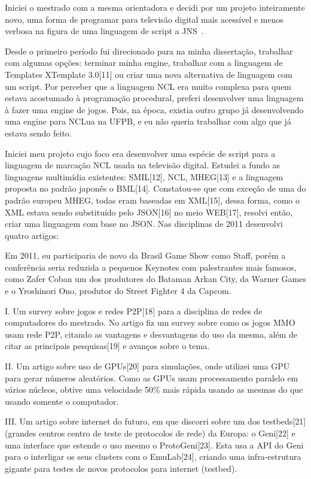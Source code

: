 \documentclass[10pt,a4paper,oneside]{book}
\begin{document}
Iniciei o mestrado com a mesma orientadora e decidi por um projeto inteiramente novo, uma forma 
de programar para televisão digital mais acessível e menos verbosa na figura de uma linguagem de 
script a JNS~\cite{silva2013jns}.

 Desde o primeiro período fui direcionado para na minha dissertação, trabalhar com algumas opções: 
 terminar minha engine, trabalhar com a linguagem de Templates XTemplate 3.0[11] ou criar uma nova 
 alternativa de linguagem com um script. Por perceber que a linguagem NCL era muito complexa para 
 quem estava acostumado à programação procedural, preferi desenvolver uma linguagem à fazer uma 
 engine de jogos. Pois, na época, existia outro grupo já desenvolvendo uma engine para NCLua na 
 UFPB, e eu não queria trabalhar com algo que já estava sendo feito.

Iniciei meu projeto cujo foco era desenvolver uma espécie de script para a linguagem de marcação 
NCL usada na televisão digital. Estudei a fundo as linguagens multimídia existentes: SMIL[12], NCL, 
MHEG[13] e a linguagem proposta no padrão japonês o BML[14]. Constatou-se que com exceção de uma do 
padrão europeu MHEG, todas eram baseadas em XML[15], dessa forma, como o XML estava sendo substituído 
pelo JSON[16] no meio WEB[17], resolvi então, criar uma linguagem com base no JSON.  
Nas disciplinas de 2011 desenvolvi quatro artigos:

Em 2011, eu participaria de novo da Brasil Game Show como Staff, porém a conferência seria reduzida 
a pequenos Keynotes com palestrantes mais famosos, como  Zafer Coban um dos produtores do Bataman 
Arkan City, da Warner Games e o Yroshinori Ono, produtor do Street Fighter 4 da Capcom.

I.  Um survey sobre jogos e redes P2P[18] para a disciplina de redes de computadores do mestrado. 
No artigo fiz um survey sobre como os jogos MMO usam rede P2P, citando as vantagens e desvantagens 
do uso da mesma, além de citar as principais pesquisas[19] e avanços sobre o tema.

II. Um artigo sobre uso de GPUs[20] para simulações, onde utilizei uma GPU para gerar números 
aleatórios. Como as GPUs usam processamento paralelo em vários núcleos, obtive uma velocidade 
50\% mais rápida usando as mesmas do que usando somente o computador.

III. Um artigo sobre internet do futuro, em que discorri sobre um dos testbeds[21] 
(grandes centros centro de teste de protocolos de rede) da Europa: o Geni[22] e uma 
interface que estende o uso mesmo o ProtoGeni[23]. Esta usa a API do Geni para o interligar os 
seus clusters com o EmuLab[24],  criando uma infra-estrutura gigante para testes de novos 
protocolos para internet (testbed).
\end{document}
